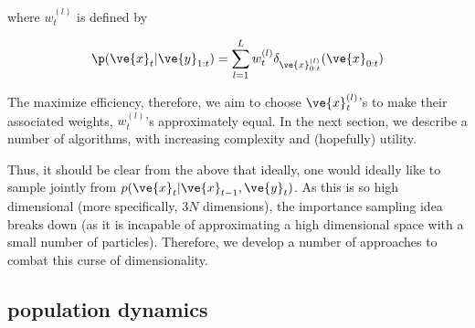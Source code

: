 \documentclass[12pt]{article}
\newcommand{\x}{\ve{x}}
\newcommand{\y}{\ve{y}}
\begin{document}
\noindent where $w_t^{(l)}$ is defined by

\begin{align}
\p(\x_{t} | \y_{1:t}) = \sum_{l=1}^L w_t^{(l)} \delta_{\x_{0:t}^{(l)}} (\x_{0:t})
\end{align}

The maximize efficiency, therefore, we aim to choose $\x_t^{(l)}$'s to make their associated weights, $w_t^{(l)}$'s approximately equal. In the next section, we describe a number of algorithms, with increasing complexity and (hopefully) utility. 

Thus, it should be clear from the above that ideally, one would ideally like to sample jointly from $p(\x_t | \x_{t-1}, \y_t)$.  As this is so high dimensional (more specifically, $3N$ dimensions), the importance sampling idea breaks down (as it is incapable of approximating a high dimensional space with a small number of particles).  Therefore, we develop a number of approaches to combat this curse of dimensionality.


%
%
%
%

\subsection{population dynamics}
\end{document}
